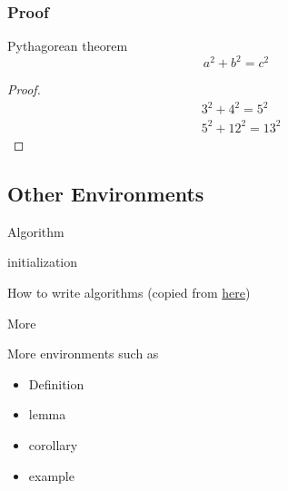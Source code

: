 \begin{frame}
    \frametitle{Proof}

    \begin{block}{Pythagorean theorem}
        \vspace*{-\baselineskip}\setlength\belowdisplayshortskip{0.1pt}
        $$a^2 + b^2 = c^2$$
    \end{block}
    
    \vspace{0.4cm}

    \begin{proof}
        \vspace*{-\baselineskip}\setlength\belowdisplayshortskip{0pt}
        \begin{align*}
            &3^2 + 4^2 = 5^2\\
            &5^2 + 12^2 = 13^2
        \end{align*}
    \end{proof}
    
\end{frame}

\subsection{Other Environments}

\begin{frame}[shrink=15]{Algorithm}
    
    \begin{algorithm}[H]
        initialization\;
        \caption{How to write algorithms
        (copied from \href{https://en.wikibooks.org/wiki/LaTeX/Algorithms}{here})}
        \end{algorithm}
\end{frame}

\begin{frame}{More}

    More environments such as

    \begin{itemize}
        \item Definition
        \item lemma
        \item corollary
        \item example
    \end{itemize}
    
\end{frame}

